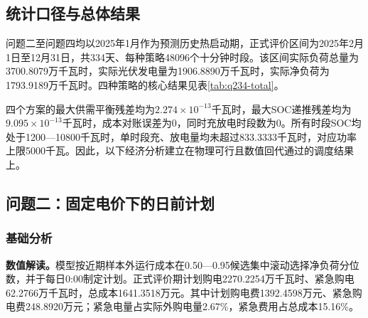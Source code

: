 \documentclass[UTF8,a4paper,12pt,fontset=fandol]{ctexart}
\numberwithin{equation}{section}
\begin{document}
\subsection{统计口径与总体结果}

问题二至问题四均以2025年1月作为预测历史热启动期，正式评价区间为2025年2月1日至12月31日，共334天、每种策略48096个十分钟时段。该区间实际负荷总量为3700.8079万千瓦时，实际光伏发电量为1906.8890万千瓦时，实际净负荷为1793.9189万千瓦时。四种策略的核心结果见表\ref{tab:q234-total}。

\begin{table}[H]
\centering
\caption{问题二至问题四正式评价期总体结果}
\label{tab:q234-total}
\end{table}

四个方案的最大供需平衡残差均为$2.274\times10^{-13}$千瓦时，最大SOC递推残差均为$9.095\times10^{-13}$千瓦时，成本对账误差为0，同时充放电时段数为0。所有时段SOC均处于1200---10800千瓦时，单时段充、放电量均未超过833.3333千瓦时，对应功率上限5000千瓦。因此，以下经济分析建立在物理可行且数值回代通过的调度结果上。

\subsection{问题二：固定电价下的日前计划}

\subsubsection{基础分析}

\textbf{数值解读。}模型按近期样本外运行成本在0.50---0.95候选集中滚动选择净负荷分位数，并于每日0:00制定计划。正式评价期计划购电2270.2254万千瓦时、紧急购电62.2766万千瓦时，总成本1641.3518万元。其中计划购电费1392.4598万元、紧急购电费248.8920万元；紧急电量占实际外购电量2.67\%，紧急费用占总成本15.16\%。
\end{document}
